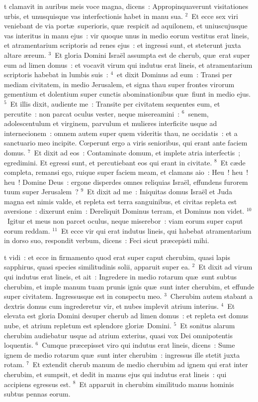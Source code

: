 \bchapter
{}t clamavit in auribus meis voce magna, dicens~: Appropinquaverunt visitationes urbis, et unusquisque vas interfectionis habet in manu sua.
${}^{2}$~Et ecce sex viri veniebant de via port\ae\ superioris, qu\ae\ respicit ad aquilonem, et uniuscujusque vas interitus in manu ejus~: vir quoque unus in medio eorum vestitus erat lineis, et atramentarium scriptoris ad renes ejus~: et ingressi sunt, et steterunt juxta altare \ae reum.
${}^{3}$~Et gloria Domini Isra\"el assumpta est de cherub, qu\ae\ erat super eum ad limen domus~: et vocavit virum qui indutus erat lineis, et atramentarium scriptoris habebat in lumbis suis~:
${}^{4}$~et dixit Dominus ad eum~: Transi per mediam civitatem, in medio Jerusalem, et signa thau super frontes virorum gementium et dolentium super cunctis abominationibus qu\ae\ fiunt in medio ejus.
${}^{5}$~Et illis dixit, audiente me~: Transite per civitatem sequentes eum, et percutite~: non parcat oculus vester, neque misereamini~:
${}^{6}$~senem, adolescentulum et virginem, parvulum et mulieres interficite usque ad internecionem~: omnem autem super quem videritis thau, ne occidatis~: et a sanctuario meo incipite. Cœperunt ergo a viris senioribus, qui erant ante faciem domus.
${}^{7}$~Et dixit ad eos~: Contaminate domum, et implete atria interfectis~; egredimini. Et egressi sunt, et percutiebant eos qui erant in civitate.
${}^{8}$~Et c\ae de completa, remansi ego, ruique super faciem meam, et clamans aio~: Heu~! heu~! heu~! Domine Deus~: ergone disperdes omnes reliquias Isra\"el, effundens furorem tuum super Jerusalem~?
${}^{9}$~Et dixit ad me~: Iniquitas domus Isra\"el et Juda magna est nimis valde, et repleta est terra sanguinibus, et civitas repleta est aversione~: dixerunt enim~: Dereliquit Dominus terram, et Dominus non videt.
${}^{10}$~Igitur et meus non parcet oculus, neque miserebor~: viam eorum super caput eorum reddam.
${}^{11}$~Et ecce vir qui erat indutus lineis, qui habebat atramentarium in dorso suo, respondit verbum, dicens~: Feci sicut pr\ae cepisti mihi.

\bchapter
{}t vidi~: et ecce in firmamento quod erat super caput cherubim, quasi lapis sapphirus, quasi species similitudinis solii, apparuit super ea.
${}^{2}$~Et dixit ad virum qui indutus erat lineis, et ait~: Ingredere in medio rotarum qu\ae\ sunt subtus cherubim, et imple manum tuam prunis ignis qu\ae\ sunt inter cherubim, et effunde super civitatem. Ingressusque est in conspectu meo.
${}^{3}$~Cherubim autem stabant a dextris domus cum ingrederetur vir, et nubes implevit atrium interius.
${}^{4}$~Et elevata est gloria Domini desuper cherub ad limen domus~: et repleta est domus nube, et atrium repletum est splendore glori\ae\ Domini.
${}^{5}$~Et sonitus alarum cherubim audiebatur usque ad atrium exterius, quasi vox Dei omnipotentis loquentis.
${}^{6}$~Cumque pr\ae cepisset viro qui indutus erat lineis, dicens~: Sume ignem de medio rotarum qu\ae\ sunt inter cherubim~: ingressus ille stetit juxta rotam.
${}^{7}$~Et extendit cherub manum de medio cherubim ad ignem qui erat inter cherubim, et sumpsit, et dedit in manus ejus qui indutus erat lineis~: qui accipiens egressus est.
${}^{8}$~Et apparuit in cherubim similitudo manus hominis subtus pennas eorum.



